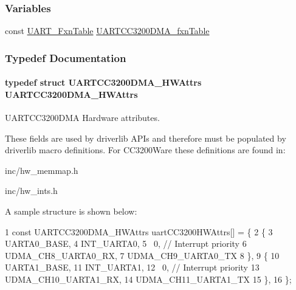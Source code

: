 \subsubsection*{Variables}
\begin{DoxyCompactItemize}
\item 
const \hyperlink{struct_u_a_r_t___fxn_table}{U\+A\+R\+T\+\_\+\+Fxn\+Table} \hyperlink{_u_a_r_t_c_c3200_d_m_a_8h_a21db4fb893627de050a47e19bbef9866}{U\+A\+R\+T\+C\+C3200\+D\+M\+A\+\_\+fxn\+Table}
\end{DoxyCompactItemize}


\subsubsection{Typedef Documentation}
\paragraph[{U\+A\+R\+T\+C\+C3200\+D\+M\+A\+\_\+\+H\+W\+Attrs}]{\setlength{\rightskip}{0pt plus 5cm}typedef struct {\bf U\+A\+R\+T\+C\+C3200\+D\+M\+A\+\_\+\+H\+W\+Attrs}  {\bf U\+A\+R\+T\+C\+C3200\+D\+M\+A\+\_\+\+H\+W\+Attrs}}\label{_u_a_r_t_c_c3200_d_m_a_8h_a288a7e8d5d3c9cd0a6648e68bc375d47}


U\+A\+R\+T\+C\+C3200\+D\+M\+A Hardware attributes. 

These fields are used by driverlib A\+P\+Is and therefore must be populated by driverlib macro definitions. For C\+C3200\+Ware these definitions are found in\+:
\begin{DoxyItemize}
\item inc/hw\+\_\+memmap.\+h
\item inc/hw\+\_\+ints.\+h
\end{DoxyItemize}

A sample structure is shown below\+: 
\begin{DoxyCode}
1 const UARTCC3200DMA\_HWAttrs uartCC3200HWAttrs[] = \{
2     \{
3         UARTA0\_BASE,
4         INT\_UARTA0,
5         ~0,          // Interrupt priority
6         UDMA\_CH8\_UARTA0\_RX,
7         UDMA\_CH9\_UARTA0\_TX
8     \},
9     \{
10         UARTA1\_BASE,
11         INT\_UARTA1,
12         ~0,          // Interrupt priority
13         UDMA\_CH10\_UARTA1\_RX,
14         UDMA\_CH11\_UARTA1\_TX
15     \},
16 \};
\end{DoxyCode}
